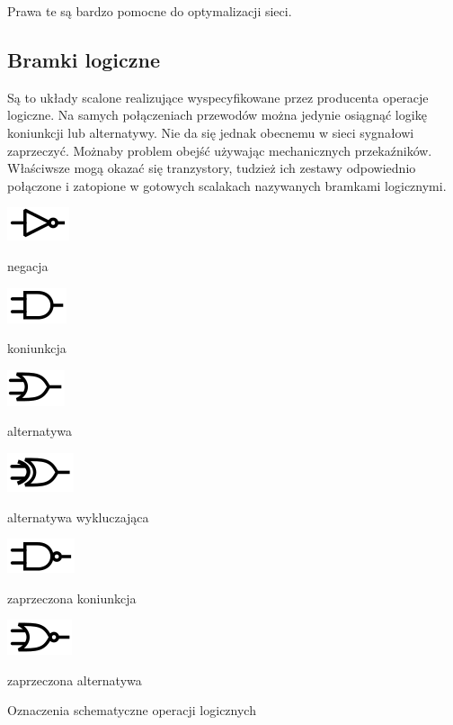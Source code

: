 \documentclass[a4paper,12pt]{article}
\begin{document}
Prawa te są bardzo pomocne do optymalizacji sieci.


\subsection{Bramki logiczne}
Są to układy scalone realizujące wyspecyfikowane przez producenta operacje logiczne. Na samych połączeniach przewodów można jedynie osiągnąć logikę koniunkcji lub alternatywy. Nie da się jednak obecnemu w sieci sygnałowi zaprzeczyć. Możnaby problem obejść używając mechanicznych przekaźników. Właściwsze mogą okazać się tranzystory, tudzież ich zestawy odpowiednio połączone i zatopione w gotowych scalakach nazywanych bramkami logicznymi.

\begin{table}[h!]
\centering
\begin{minipage}{2.5cm}
   \centering
   \includegraphics{grafika/obwody/not.png}
   \caption*{negacja}
\end{minipage}
\begin{minipage}{2.5cm}
   \centering
   \includegraphics{grafika/obwody/and.png}
   \caption*{koniunkcja}
\end{minipage}
\begin{minipage}{2.5cm}
   \centering
   \includegraphics{grafika/obwody/or.png}
   \caption*{alternatywa}
\end{minipage}
\begin{minipage}{2.5cm}
   \centering
   \includegraphics{grafika/obwody/xor.png}
   \caption*{alternatywa wykluczająca}
\end{minipage}
\begin{minipage}{2.5cm}
   \centering
   \includegraphics{grafika/obwody/nand.png}
   \caption*{zaprzeczona koniunkcja}
\end{minipage}
\begin{minipage}{2.5cm}
   \centering
   \includegraphics{grafika/obwody/nor.png}
   \caption*{zaprzeczona alternatywa}
\end{minipage}

\caption*{Oznaczenia schematyczne operacji logicznych}
\end{table}
\end{document}
